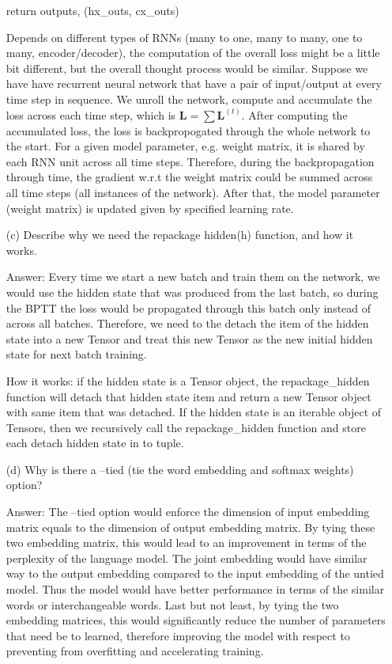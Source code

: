 \documentclass[12pt,letterpaper]{article}
\begin{document}
\begin{itemize}
\begin{python}
        return outputs, (hx_outs, cx_outs)
    \end{python}
    
    Depends on different types of RNNs (many to one, many to many, one to many, encoder/decoder), the computation of the overall loss might be a little bit different, but the overall thought process would be similar. Suppose we have have recurrent neural network that have a pair of input/output at every time step in sequence. We unroll the network, compute and accumulate the loss across each time step, which is $\textbf{L} = \sum \textbf{L}^{(t)}$. After computing the accumulated loss, the loss is backpropogated through the whole network to the start. For a given model parameter, e.g. weight matrix, it is shared by each RNN unit across all time steps. Therefore, during the backpropagation through time, the gradient w.r.t the weight matrix could be summed across all time steps (all instances of the network). After that, the model parameter (weight matrix) is updated given by specified learning rate.
    
    \item[(c)]Describe why we need the repackage hidden(h) function, and how it works.
    
    Answer: Every time we start a new batch and train them on the network, we would use the hidden state that was produced from the last batch, so during the BPTT the loss would be propagated through this batch only instead of across all batches. Therefore, we need to the detach the item of the hidden state into a new Tensor and treat this new Tensor as the new initial hidden state for next batch training.
    
    How it works: if the hidden state is a Tensor object, the repackage\_hidden function will detach that hidden state item and return a new Tensor object with same item that was detached. If the hidden state is an iterable object of Tensors, then we recursively call the repackage\_hidden function and store each detach hidden state in to tuple.
    
    \item[(d)]Why is there a --tied (tie the word embedding and softmax weights) option?
    
    Answer: The --tied option would enforce the dimension of input embedding matrix equals to the dimension of output embedding matrix. By tying these two embedding matrix, this would lead to an improvement in terms of the perplexity of the language model. The joint embedding would have similar way to the output embedding compared to the input embedding of the untied model. Thus the model would have better performance in terms of the similar words or interchangeable words. Last but not least, by tying the two embedding matrices, this would significantly reduce the number of parameters that need be to learned, therefore improving the model with respect to preventing from overfitting and accelerating training.
    

\end{itemize}
\end{document}
